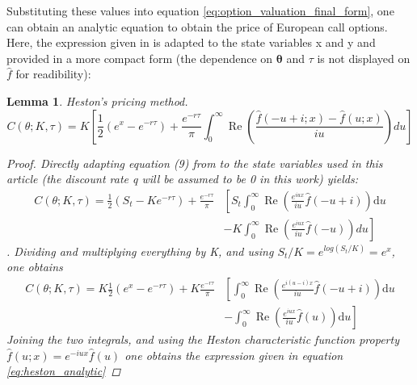 \documentclass[12,twoside]{mammeTFM}
\newtheorem{lem}[thm]{Lemma}
\theoremstyle{definition}
\theoremstyle{remark}
\begin{document}
Substituting these values into equation \ref{eq:option_valuation_final_form}, one can obtain an analytic equation to obtain the price of European call options. Here, the expression given in \cite{cui17} is adapted to the state variables x and y and provided in a more compact form (the dependence on $\boldsymbol{\theta}$ and $\tau$ is not displayed on $\hat{f}$ for readibility):

\begin{lem} Heston's pricing method.
\begin{equation} \label{eq:heston_analytic}
C(\theta ; K, \tau)= K \left[ \frac{1}{2}\left(e^x- e^{-r \tau}\right) 
 + \frac{e^{-r \tau}}{\pi}\int_{0}^{\infty} \operatorname{Re}\left( \frac{\hat{f}(-u+i; x) - \hat{f}(u; x)}{i u}\right) du\right]
\end{equation}
\begin{proof}
Directly adapting equation (9) from \cite{cui17} to the state variables used in this article (the discount rate q will be assumed to be 0 in this work) yields:
\begin{equation}
\begin{aligned}
C(\theta ; K, \tau)= \frac{1}{2}\left(S_{t}-K e^{-r \tau}\right) + \frac{e^{-r \tau}}{\pi}& \left[  S_t \int_{0}^{\infty} \operatorname{Re}\left(\frac{e^{i u x}}{i u} \hat{f}(-u+i)\right) \mathrm{d} u\right. \\
&\left.- K \int_{0}^{\infty} \operatorname{Re}\left(\frac{e^{i u x}}{i u} \hat{f}(-u)\right) du\right]
\end{aligned}
\end{equation}
. Dividing and multiplying everything by K, and using $S_t/K = e^{log(S_t/K)} = e^x$, one obtains
\begin{equation}
\begin{aligned}
C(\theta ; K, \tau)= K \frac{1}{2}\left(e^x- e^{-r \tau}\right) + K\frac{e^{-r \tau}}{\pi}& \left[\int_{0}^{\infty} \operatorname{Re}\left(\frac{e^{i (u - i) x}}{i u} \hat{f}(-u+i)\right) \mathrm{d} u\right. \\
&\left.- \int_{0}^{\infty} \operatorname{Re}\left(\frac{e^{i u x}}{i u} \hat{f}(u)\right) \mathrm{d} u\right]
\end{aligned}
\end{equation}
Joining the two integrals, and using the Heston characteristic function property $\hat{f}(u; x) = e^{-iu x}\hat{f}(u)$ one obtains the expression given in equation \ref{eq:heston_analytic}
\end{proof}
\end{lem}
\end{document}
